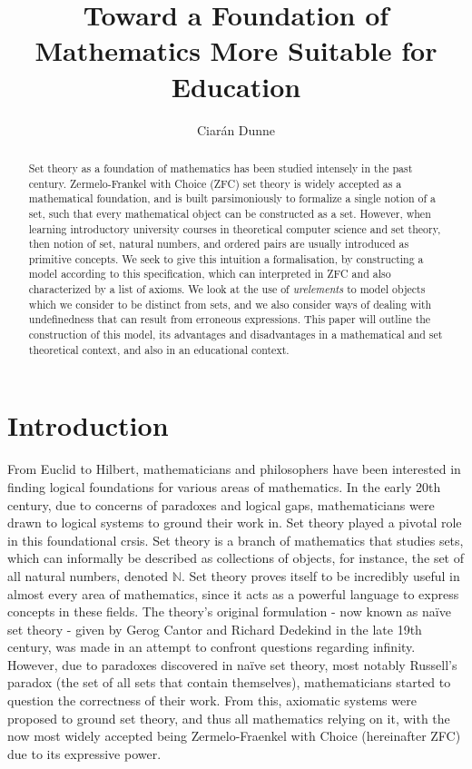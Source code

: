 \documentclass[12pt]{article}
\title{Toward a Foundation of Mathematics More Suitable for Education}
\author{Ciarán Dunne}
\begin{document}
\begin{minipage}[h]{0.9\textwidth}
\maketitle
\begin{abstract}
Set theory as a foundation of mathematics has been studied intensely in the past century. Zermelo-Frankel with Choice (ZFC) set theory is widely accepted as a mathematical foundation, and is built parsimoniously to formalize a single notion of a set, such that every mathematical object can be constructed as a set. However, when learning introductory university courses in theoretical computer science and set theory, then notion of set, natural numbers, and ordered pairs are usually introduced as primitive concepts. We seek to give this intuition a formalisation, by constructing a model according to this specification, which can interpreted in ZFC and also characterized by a list of axioms. We look at the use of \emph{urelements} to model objects which we consider to be distinct from sets, and we also consider ways of dealing with undefinedness that can result from erroneous expressions. This paper will outline the construction of this model, its advantages and disadvantages in a mathematical and set theoretical context, and also in an educational context.
\end{abstract}
\end{minipage}
\clearpage

\section{Introduction}
From Euclid to Hilbert, mathematicians and philosophers have been interested in finding logical foundations for various areas of mathematics. In the early 20th century, due to concerns of paradoxes and logical gaps, mathematicians were drawn to logical systems to ground their work in. Set theory played a pivotal role in this foundational crsis. Set theory is a branch of mathematics that studies sets, which can informally be described as collections of objects, for instance, the set of all natural numbers, denoted $\mathbb{N}$. Set theory proves itself to be incredibly useful in almost every area of mathematics, since it acts as a powerful language to express concepts in these fields.
The theory's original formulation - now known as na\"ive set theory - given by Gerog Cantor and Richard Dedekind in the late 19th century, was made in an attempt to confront questions regarding infinity. However, due to paradoxes discovered in na\"ive set theory, most notably Russell's paradox (the set of all sets that contain themselves), mathematicians started to question the correctness of their work. From this, axiomatic systems were proposed to ground set theory, and thus all mathematics relying on it, with the now most widely accepted being Zermelo-Fraenkel with Choice (hereinafter ZFC) due to its expressive power.
\end{document}

